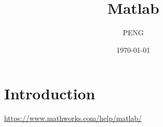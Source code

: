 \documentclass{article}
\title{Matlab}
\author{PENG}
\date{\today}
\begin{document}
\maketitle
\tableofcontents
\section{Introduction}
\url{https://www.mathworks.com/help/matlab/}

\printbibliography
\end{document}
